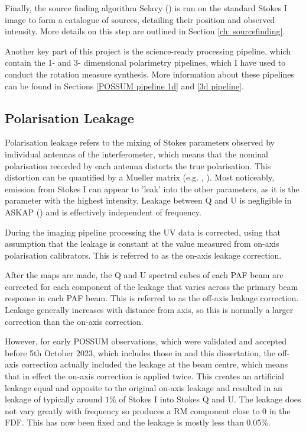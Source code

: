 Finally, the source finding algorithm Selavy (\cite{Selavy_Whiting_2012}) is run on the standard Stokes I image to form a catalogue of sources, detailing their position and observed intensity. More details on this step are outlined in Section \ref{ch: sourcefinding}.

Another key part of this project is the science-ready processing pipeline, which contain the 1- and 3- dimensional polarimetry pipelines, which I have used to conduct the rotation measure synthesis. More information about these pipelines can be found in Sections \ref{POSSUM pipeline 1d} and \ref{3d pipeline}.

\subsection{Polarisation Leakage}

Polarisation leakage refers to the mixing of Stokes parameters observed by individual antennas of the interferometer, which means that the nominal polarisation recorded by each antenna distorts the true polarisation. This distortion can be quantified by a Mueller matrix (e.g. \cite{2009_mueller}, \cite{gil2022polarized}). Most noticeably, emission from Stokes I can appear to 'leak' into the other parameters, as it is the parameter with the highest intensity.  Leakage between Q and U is negligible in ASKAP (\cite{sault2015aces}) and is effectively independent of frequency.

During the imaging pipeline processing the UV data is corrected, using that assumption that the leakage is constant at the value measured from on-axis polarisation calibrators. This is referred to as the on-axis leakage correction. 

After the maps are made, the Q and U spectral cubes of each PAF beam are corrected for each component of the leakage that varies across the primary beam response in each PAF beam. This is referred to as the off-axis leakage correction. Leakage generally increases with distance from axis, so this is normally a larger correction than the on-axis correction. 

However, for early POSSUM observations, which were validated and accepted before 5th October 2023, which includes those in \cite{vanderwoude2024prototypefaradayrotationmeasure} and this dissertation, the off-axis correction actually included the leakage at the beam centre, which means that in effect the on-axis correction is applied twice. This creates an artificial leakage equal and opposite to the original on-axis leakage and resulted in an leakage of typically around $1\%$ of Stokes I into Stokes Q and U. The leakage does not vary greatly with frequency so produces a RM component close to 0 in the FDF. This has now been fixed and the leakage is mostly less than 0.05$\%$.

